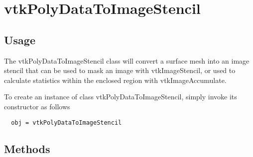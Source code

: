 \section{vtkPolyDataToImageStencil}

\subsection{Usage}

 The vtkPolyDataToImageStencil class will convert a surface mesh
 into an image stencil that can be used to mask an image with
 vtkImageStencil, or used to calculate statistics within the
 enclosed region with vtkImageAccumulate.

To create an instance of class vtkPolyDataToImageStencil, simply
invoke its constructor as follows
\begin{verbatim}
  obj = vtkPolyDataToImageStencil
\end{verbatim}
\subsection{Methods}

